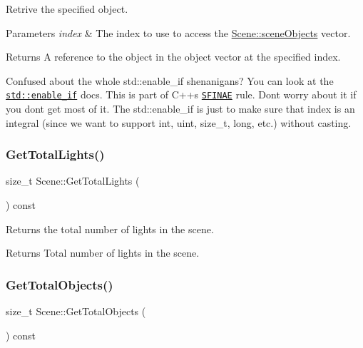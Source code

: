 Retrive the specified object.


\begin{DoxyParams}{Parameters}
{\em index} & The index to use to access the \hyperlink{class_scene_a871382922b2a04d7883cf6d34529b5df}{Scene\+::scene\+Objects} vector. \\
\hline
\end{DoxyParams}
\begin{DoxyReturn}{Returns}
A reference to the object in the object vector at the specified index.
\end{DoxyReturn}
Confused about the whole std\+::enable\+\_\+if shenanigans? You can look at the \href{http://en.cppreference.com/w/cpp/types/enable_if}{\tt std\+::enable\+\_\+if} docs. This is part of C++\textquotesingle{}s \href{http://en.cppreference.com/w/cpp/language/sfinae}{\tt S\+F\+I\+N\+AE} rule. Don\textquotesingle{}t worry about it if you don\textquotesingle{}t get most of it. The std\+::enable\+\_\+if is just to make sure that index is an integral (since we want to support int, uint, size\+\_\+t, long, etc.) without casting. \hypertarget{class_scene_aca8ac690e36148926c6403d53f5f8527}{}\label{class_scene_aca8ac690e36148926c6403d53f5f8527}
\subsubsection{\texorpdfstring{Get\+Total\+Lights()}{GetTotalLights()}}
{\footnotesize\ttfamily size\+\_\+t Scene\+::\+Get\+Total\+Lights (\begin{DoxyParamCaption}{ }\end{DoxyParamCaption}) const\hspace{0.3cm}{\ttfamily [inline]}}



Returns the total number of lights in the scene.

\begin{DoxyReturn}{Returns}
Total number of lights in the scene.
\end{DoxyReturn}
\hypertarget{class_scene_a66108b1261560387be08e2b8226c2237}{}\label{class_scene_a66108b1261560387be08e2b8226c2237}
\subsubsection{\texorpdfstring{Get\+Total\+Objects()}{GetTotalObjects()}}
{\footnotesize\ttfamily size\+\_\+t Scene\+::\+Get\+Total\+Objects (\begin{DoxyParamCaption}{ }\end{DoxyParamCaption}) const\hspace{0.3cm}{\ttfamily [inline]}}



